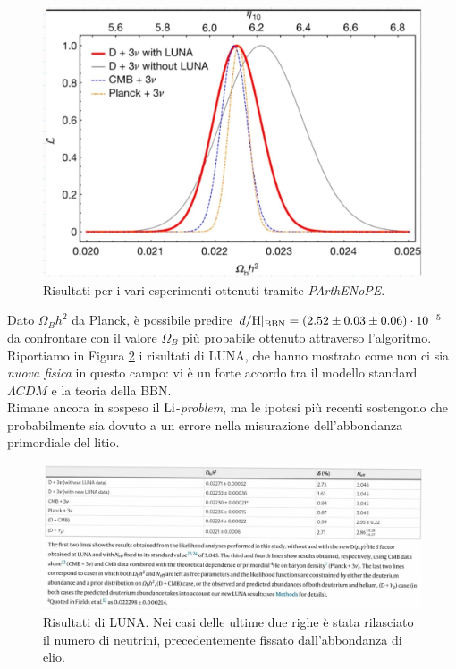 \begin{figure}[!h]
    \centering
    \includegraphics[scale=0.2]{Immagini/0315_luna.png}
    \caption{Risultati per i vari esperimenti ottenuti tramite \textit{PArthENoPE}.}
    \label{0315_parthenope}
\end{figure}
\newpage
\noindent Dato $\Omega_B h^2$ da Planck, è possibile predire $d/\ce{H}|_\text{BBN} = (2.52\pm0.03\pm0.06)\cdot\ord{-5}$ da confrontare con il valore $\Omega_B$ più probabile ottenuto attraverso l'algoritmo. Riportiamo in Figura \ref{0315_risultati} i risultati di LUNA, che hanno mostrato come non ci sia \textit{nuova fisica} in questo campo: vi è un forte accordo tra il modello standard $\Lambda CDM$ e la teoria della BBN.\\
Rimane ancora in sospeso il $\ce{Li}$-\textit{problem}, ma le ipotesi più recenti sostengono che probabilmente sia dovuto a un errore nella misurazione dell'abbondanza primordiale del litio.



\begin{figure}[h]
    \centering
    \includegraphics[scale=0.26]{Immagini/0315_risultati.png}
    \caption{Risultati di LUNA. Nei casi delle ultime due righe è stata rilasciato il numero di neutrini, precedentemente fissato dall'abbondanza di elio.}
    \label{0315_risultati}
\end{figure}